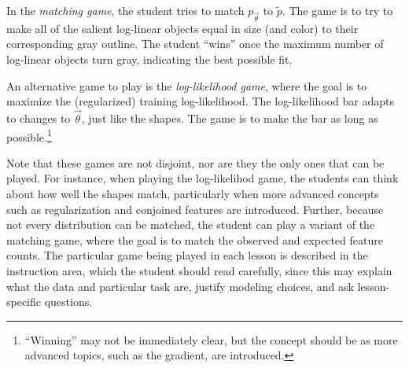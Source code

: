 \documentclass[11pt,letterpaper]{article}
\newcommand{\Note}[1]{}
\renewcommand{\Note}[1]{\hl{[#1]}}
\newcommand{\NoteSigned}[3]{{\sethlcolor{#2}\Note{#1: #3}}}
\newcommand{\NoteFF}[1]{\NoteSigned{FF}{LightBlue}{#1}}
\begin{document}
In the \textit{matching game}, the student tries to match $p_{\vec{\theta}}$ to  $\tilde{p}$. 
The game is to try to make all of the salient log-linear objects 
equal in size (and color) to their corresponding gray outline. The student ``wins'' once the maximum
number of log-linear objects turn gray, indicating the best possible fit.

An alternative game to play is the \textit{log-likelihood game}, where the goal is to
maximize the (regularized) training log-likelihood. The log-likelihood bar adapts to 
changes to $\vec{\theta}$, just like the shapes. The game is to make the bar as 
long as possible.\footnote{``Winning'' may not be immediately clear, but the concept should be 
as more advanced topics, such as the gradient, are introduced.}

Note that these games are not disjoint, nor are they the only ones that can be played.
For instance, when playing the log-likelihod game, the students can think about how well 
the shapes match, particularly when more advanced concepts such as regularization and 
conjoined features are introduced. Further, because not every distribution can be matched, 
the student can play a variant of the matching game, where the goal
is to match the observed and expected feature counts. The particular game being played
in each lesson is described in the instruction area, which the student should
read carefully, since this may explain what the data and particular task are, justify 
modeling choices, and ask lesson-specific questions. 


\end{document}

